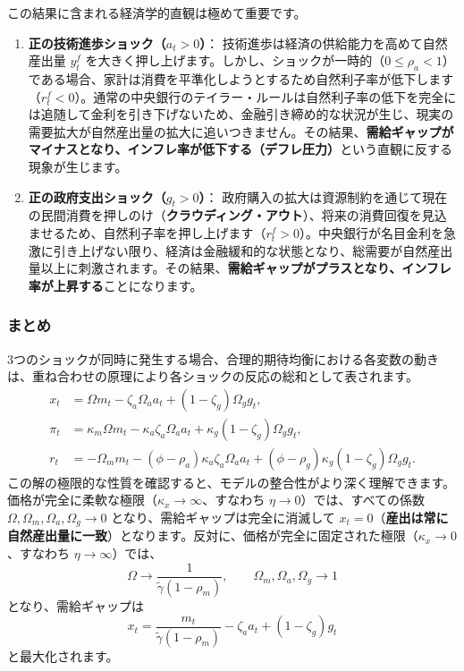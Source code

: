 \documentclass[
  japanese,
  lualatex,
  ja=standard,
  12pt,
  a4paper]{ltjsarticle}
\providecommand{\tightlist}{%
  \setlength{\itemsep}{0pt}\setlength{\parskip}{0pt}}
\begin{document}
この結果に含まれる経済学的直観は極めて重要です。

\begin{enumerate}
\def\labelenumi{\arabic{enumi}.}
\tightlist
\item
  \textbf{正の技術進歩ショック（\(a_t>0\)）}：
  技術進歩は経済の供給能力を高めて自然産出量 \(y_t^f\)
  を大きく押し上げます。しかし、ショックが一時的（\(0\leq\rho_a<1\)）である場合、家計は消費を平準化しようとするため自然利子率が低下します（\(r_t^f<0\)）。通常の中央銀行のテイラー・ルールは自然利子率の低下を完全には追随して金利を引き下げないため、金融引き締め的な状況が生じ、現実の需要拡大が自然産出量の拡大に追いつきません。その結果、\textbf{需給ギャップがマイナスとなり、インフレ率が低下する（デフレ圧力）}という直観に反する現象が生じます。
\item
  \textbf{正の政府支出ショック（\(g_t>0\)）}：
  政府購入の拡大は資源制約を通じて現在の民間消費を押しのけ（\textbf{クラウディング・アウト}）、将来の消費回復を見込ませるため、自然利子率を押し上げます（\(r_t^f>0\)）。中央銀行が名目金利を急激に引き上げない限り、経済は金融緩和的な状態となり、総需要が自然産出量以上に刺激されます。その結果、\textbf{需給ギャップがプラスとなり、インフレ率が上昇する}ことになります。
\end{enumerate}

\Needspace{0.33\textheight}

\subsubsection{まとめ}\label{ux307eux3068ux3081}

3つのショックが同時に発生する場合、合理的期待均衡における各変数の動きは、重ね合わせの原理により各ショックの反応の総和として表されます。
\[
\begin{aligned}
x_t
&=
\Omega m_t
- \zeta_a \Omega_a a_t
+ (1-\zeta_g)\Omega_g g_t,\\
\pi_t
&=
\kappa_m \Omega m_t
- \kappa_a \zeta_a \Omega_a a_t
+ \kappa_g (1-\zeta_g)\Omega_g g_t,\\
r_t
&=
-\Omega_m m_t
-(\phi-\rho_a)\kappa_a\zeta_a\Omega_a a_t
+(\phi-\rho_g)\kappa_g(1-\zeta_g)\Omega_g g_t.
\end{aligned}
\]
この解の極限的な性質を確認すると、モデルの整合性がより深く理解できます。価格が完全に柔軟な極限（\(\kappa_x\to\infty\)、すなわち
\(\eta\to0\)）では、すべての係数
\(\Omega, \Omega_m, \Omega_a, \Omega_g \to 0\)
となり、需給ギャップは完全に消滅して
\(x_t=0\)（\textbf{産出は常に自然産出量に一致}）となります。反対に、価格が完全に固定された極限（\(\kappa_x\to0\)、すなわち
\(\eta\to\infty\)）では、 \[
\Omega\to\frac{1}{\tilde{\gamma}(1-\rho_m)},
\qquad
\Omega_m,\Omega_a,\Omega_g\to1
\] となり、需給ギャップは \[
x_t
=
\frac{m_t}{\tilde{\gamma}(1-\rho_m)}
-\zeta_a a_t
+(1-\zeta_g)g_t
\] と最大化されます。
\end{document}
